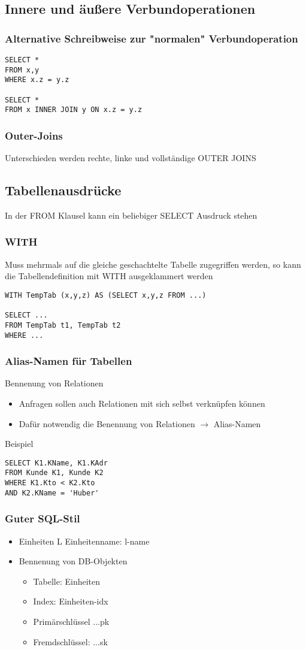 \subsection{Innere und äußere Verbundoperationen}
\subsubsection{Alternative Schreibweise zur "normalen" Verbundoperation}
\begin{lstlisting}
SELECT * 
FROM x,y
WHERE x.z = y.z

SELECT *
FROM x INNER JOIN y ON x.z = y.z
\end{lstlisting}
\subsubsection{Outer-Joins}
Unterschieden werden rechte, linke und vollständige OUTER JOINS
\subsection{Tabellenausdrücke}
In der FROM Klausel kann ein beliebiger SELECT Ausdruck stehen
\subsubsection{WITH}
Muss mehrmals auf die gleiche geschachtelte Tabelle zugegriffen werden, so kann die Tabellendefinition mit WITH ausgeklammert werden
\begin{lstlisting}
WITH TempTab (x,y,z) AS (SELECT x,y,z FROM ...)

SELECT ...
FROM TempTab t1, TempTab t2
WHERE ...
\end{lstlisting}
\subsubsection{Alias-Namen für Tabellen}
Bennenung von Relationen
\begin{itemize}
	\item Anfragen sollen auch Relationen mit sich selbst verknüpfen können
	\item Dafür notwendig die Benennung von Relationen \(\to\) Alias-Namen
\end{itemize}
Beispiel
\begin{lstlisting}
SELECT K1.KName, K1.KAdr
FROM Kunde K1, Kunde K2
WHERE K1.Kto < K2.Kto
AND K2.KName = 'Huber'
\end{lstlisting}
\subsubsection{Guter SQL-Stil}
\begin{itemize}
	\item Einheiten L Einheitenname: l-name
	\item Bennenung von DB-Objekten
	\begin{itemize}
		\item Tabelle: Einheiten
		\item Index: Einheiten-idx
		\item Primärschlüssel ...pk
		\item Fremdschlüssel: ...sk
	\end{itemize}
\end{itemize}

